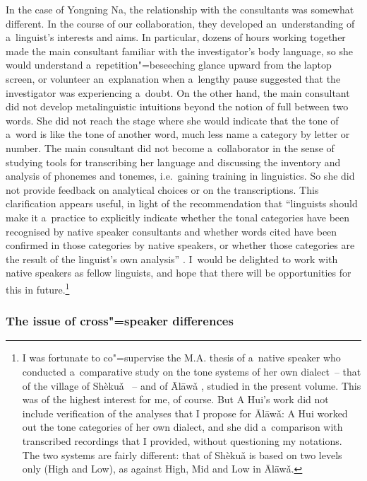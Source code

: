 In the case of Yongning Na, the relationship with the consultants was somewhat different. In the
course of our collaboration, they developed an~understanding of a~linguist’s interests and aims. In
particular, dozens of hours working together made the main consultant familiar with the investigator’s body
language, so she would understand a~repetition"=beseeching glance upward from the laptop screen, or
volunteer an~explanation when a~lengthy pause suggested that the investigator was experiencing
a~doubt. On the other hand, the main consultant did not develop metalinguistic intuitions beyond the
notion of full  between two words. She did not reach the stage where she would indicate that
the tone of a~word is like the tone of another word, much less name a category by letter or number. The main consultant did not become a~collaborator in the sense of studying tools for transcribing her language and discussing the inventory and analysis of phonemes and tonemes, i.e.\ gaining training in linguistics. So she did not provide feedback on analytical choices or on the transcriptions. This clarification appears useful, in light of the recommendation that “linguists should make it a~practice to explicitly
indicate whether the tonal categories have been recognised by native speaker consultants
and whether words cited have been confirmed in those categories by native speakers, or
whether those categories are the result of the linguist’s own analysis” \citep[638]{morey2014}. I~would be delighted to work with native speakers as fellow linguists, and hope that there will be opportunities for this in future.\footnote{I was fortunate to co"=supervise the M.A. thesis of a~native speaker who conducted a~comparative study \citep{a2016} on the tone systems of her own dialect~-- that of the village of Shèkuǎ ~-- and of Ālāwǎ , studied in the present volume. This was of the highest interest for me, of course. But A Hui's work did not include verification of the analyses that I propose for Ālāwǎ: A Hui worked out the tone categories of her own dialect, and she did a~comparison with transcribed recordings that I provided, without questioning my notations. The two systems are fairly different: that of Shèkuǎ is based on two levels only (High and Low), as against High, Mid and Low in Ālāwǎ.}


\largerpage
\subsubsection{The issue of cross"=speaker differences}
\label{sec:theissueofcrossspeakerdifferences}

